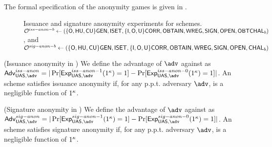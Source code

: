 The formal specification of the anonymity games is given in
.

\begin{figure*}[htp!]
  \centering
  \caption{Issuance and signature anonymity experiments for \UAS schemes.
    $\mathcal{O}^{iss-anon-b} \gets (\lbrace\mathsf{O},\mathsf{HU},\mathsf{CU}\rbrace\mathsf{GEN},\mathsf{ISET},\lbrace\mathsf{I},
    \mathsf{O},\mathsf{U}\rbrace\mathsf{CORR},\mathsf{OBTAIN},\mathsf{WREG},\mathsf{SIGN},\mathsf{OPEN},\mathsf{OBTCHAL}_b)$, and $\mathcal{O}^{sig-anon-b}
    \gets (\lbrace\mathsf{O},\mathsf{HU},\mathsf{CU}\rbrace\mathsf{GEN},\mathsf{ISET},\lbrace\mathsf{I},\mathsf{O},\mathsf{U}\rbrace
    \mathsf{CORR},\mathsf{OBTAIN},\mathsf{WREG},\mathsf{SIGN},\mathsf{OPEN},\mathsf{CHAL}_b)$}
  \label{fig:exp-uas-anonb}
\end{figure*}

\begin{definition}{(Issuance anonymity in \UAS)}
  \label{def:issue-anonymity-uas}  
  We define the advantage \AdvIssAnon of $\adv$ against \ExpIssAnonb as
  $\AdvIssAnon=|\Pr\lbrack\ExpIssAnono(1^\secpar)=1\rbrack-
  \Pr\lbrack\ExpIssAnonz(1^\secpar)=1\rbrack|$.
  An \UAS scheme satisfies issuance anonymity if, for any p.p.t. adversary
  $\adv$, \AdvIssAnon is a negligible function of $1^\kappa$.
\end{definition}

\begin{definition}{(Signature anonymity in \UAS)}
  \label{def:sign-anonymity-uas}  
  We define the advantage \AdvSigAnon of $\adv$ against \ExpSigAnonb as
  $\AdvSigAnon=|\Pr\lbrack\ExpSigAnono(1^\secpar)=1\rbrack-
  \Pr\lbrack\ExpSigAnonz(1^\secpar)=1\rbrack|$.
  An \UAS scheme satisfies signature anonymity if, for any p.p.t. adversary
  $\adv$, \AdvSigAnon is a negligible function of $1^\kappa$.
\end{definition}


